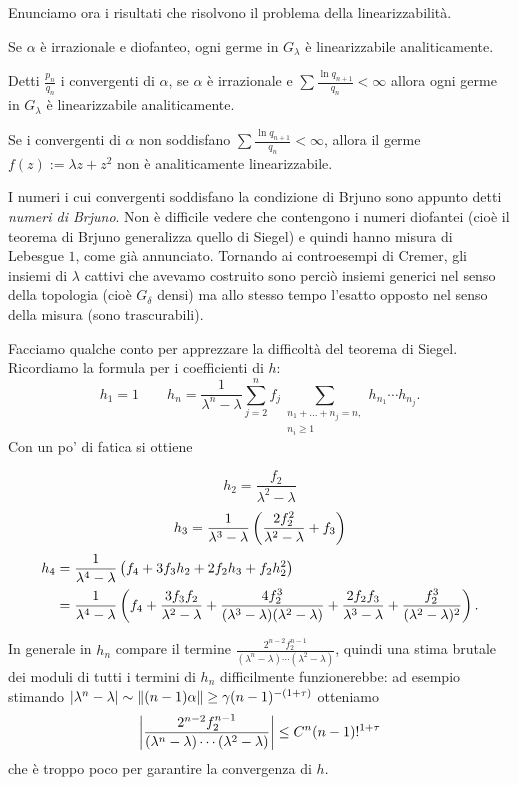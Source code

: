 Enunciamo ora i risultati che risolvono il problema della linearizzabilità.

\begin{teo}[Siegel] Se $\alpha$ è irrazionale e diofanteo, ogni germe in $G_\lambda$ è linearizzabile analiticamente.\end{teo}

\begin{teo}[Brjuno] Detti $\frac{p_n}{q_n}$ i convergenti di $\alpha$, se $\alpha$ è irrazionale
e $\sum\frac{\ln q_{n+1}}{q_n}<\infty$ allora ogni germe in $G_\lambda$ è linearizzabile analiticamente.
\end{teo}

\begin{teo}[Yoccoz] Se i convergenti di $\alpha$ non soddisfano $\sum\frac{\ln q_{n+1}}{q_n}<\infty$, allora il germe $f(z):=\lambda z+z^2$ non è analiticamente linearizzabile.\end{teo}

I numeri i cui convergenti soddisfano la condizione di Brjuno sono appunto detti \emph{numeri di Brjuno}. Non è difficile vedere che contengono i numeri diofantei (cioè il teorema di Brjuno generalizza quello di Siegel) e quindi hanno misura di Lebesgue $1$, come già annunciato. Tornando ai controesempi di Cremer, gli insiemi di $\lambda$ cattivi che avevamo costruito sono perciò insiemi generici nel senso della topologia (cioè $G_\delta$ densi) ma allo stesso tempo l'esatto opposto nel senso della misura (sono trascurabili). 

Facciamo qualche conto per apprezzare la difficoltà del teorema di Siegel. Ricordiamo la formula per i coefficienti di $h$:
\[ h_1=1 \qquad h_n=\frac{1}{\lambda^n-\lambda}\sum_{j=2}^n f_j\sum_{\substack{n_1+\dots+n_j=n,\\n_i\ge 1}}h_{n_1}\cdots h_{n_j}. \]
Con un po' di fatica si ottiene 

\[h_2=\frac{f_2}{\lambda^2-\lambda}\]
\[h_3=\frac{1}{\lambda^3-\lambda}\left(\frac{2f_2^2}{\lambda^2-\lambda}+f_3\right)\]
\[\begin{split}
   h_4 &=\frac{1}{\lambda^4-\lambda}\left(f_4+3f_3h_2+2f_2h_3+f_2h_2^2\right) \\
       &=\frac{1}{\lambda^4-\lambda}\left(f_4+\frac{3f_3f_2}{\lambda^2-\lambda}+\frac{4f_2^3}{(\lambda^3-\lambda)(\lambda^2-\lambda)} +\frac{2f_2f_3}{\lambda^3-\lambda}+\frac{f_2^3}{(\lambda^2-\lambda)^2}\right).
  \end{split}\]

In generale in $h_n$ compare il termine $\frac{2^{n-2}f_2^{n-1}}{(\lambda^n-\lambda)\cdots(\lambda^2-\lambda)}$,
quindi una stima brutale dei moduli di tutti i termini di $h_n$ difficilmente funzionerebbe: ad esempio stimando
$\left|\lambda^n-\lambda\right|\sim\left\|(n-1)\alpha\right\|\ge\gamma(n-1)^{-(1+\tau)}$ otteniamo
\[ \left|\frac{2^{n-2}f_2^{n-1}}{(\lambda^n-\lambda)\cdots(\lambda^2-\lambda)}\right|\le C^n (n-1)!^{1+\tau} \]
che è troppo poco per garantire la convergenza di $h$.


